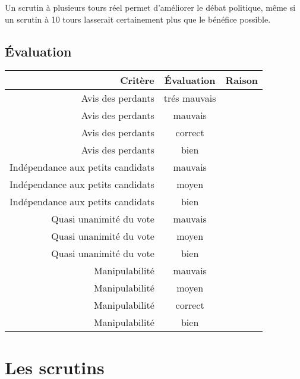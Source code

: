 \documentclass[../report]{subfiles}
\begin{document}
  Un scrutin à plusieurs tours réel permet d'améliorer le débat politique, même si un scrutin 
  à 10 tours lasserait certainement plus que le bénéfice possible.

  \section{Évaluation}

  \begin{center}
    \begin{tabular}{r|c|p{20em}}
      \hline
      Critère & Évaluation & Raison \\
      \hline
      \hline
      Avis des perdants & \cellcolor{red}trés mauvais &  \\
      Avis des perdants & \cellcolor{red}mauvais &  \\
      Avis des perdants & \cellcolor{green!25!yellow}correct &  \\
      Avis des perdants & \cellcolor{green}bien &  \\
      \hline
      Indépendance aux petits candidats & \cellcolor{red}mauvais & \\
      Indépendance aux petits candidats & \cellcolor{orange}moyen & \\
      Indépendance aux petits candidats & \cellcolor{green}bien & \\
      \hline
      Quasi unanimité du vote & \cellcolor{red}mauvais & \\
      Quasi unanimité du vote & \cellcolor{orange}moyen & \\
      Quasi unanimité du vote & \cellcolor{green}bien & \\
      \hline
      Manipulabilité & \cellcolor{red}mauvais &  \\
      Manipulabilité & \cellcolor{orange}moyen &  \\
      Manipulabilité & \cellcolor{green!25!yellow}correct &  \\
      Manipulabilité & \cellcolor{green}bien &  \\
      \hline
    \end{tabular}
  \end{center}

  \chapter{Les scrutins}
\end{document}
